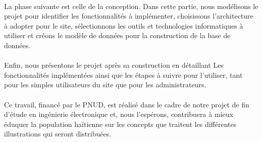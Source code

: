 \begin{center}
\begin{minipage}{0.75\textwidth}
	    \paragraph{}La phase suivante est celle de la conception. Dans cette partie, nous mod\'elisons le projet pour identifier les fonctionnalit\'es \`a impl\'ementer, choisissons l'architecture \`a adopter pour le site, s\'electionnons les outils et technologies informatiques \`a utiliser et cr\'eons le mod\`ele de donn\'ees pour la construction de la base de donn\'ees.\par
	    \paragraph{}Enfin, nous pr\'esentons le projet apr\`es sa construction en d\'etaillant Les fonctionnalit\'es impl\'ement\'ees ainsi que les \'etapes \`a suivre pour l'utiliser, tant pour les simples utilisateurs du site que pour les administrateurs. \vspace{0.5cm}
	    
	    \paragraph{} \noindent Ce travail, financ\'e par le PNUD, est r\'ealis\'e dans le cadre de notre projet de fin d'\'etude en ing\'enierie \'electronique et, nous l'esp\'erons, contribuera \`a mieux \'eduquer la population ha\"itienne sur les concepts que traitent les diff\'erentes illustrations qui seront distribu\'ees.
   	\end{minipage}
    
    













\end{center}